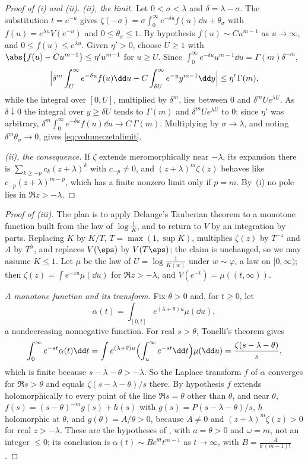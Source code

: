\begin{refsection}
\begin{proof}[Proof of (i) and (ii)]
\emph{(ii), the limit.} Let $0<\sigma<\lambda$ and $\delta=\lambda-\sigma$. The substitution $t=e^{-u}$ gives $\zeta(-\sigma)=\sigma\int_0^\infty e^{-\delta u}f(u)\dd u+\theta_\sigma$ with $f(u)=e^{\lambda u}V(e^{-u})$ and $0\le\theta_\sigma\le1$. By hypothesis $f(u)\sim Cu^{m-1}$ as $u\to\infty$, and $0\le f(u)\le e^{\lambda u}$. Given $\eta'>0$, choose $U\ge1$ with $\abs{f(u)-Cu^{m-1}}\le\eta'u^{m-1}$ for $u\ge U$. Since $\int_0^\infty e^{-\delta u}u^{m-1}\dd u=\Gamma(m)\delta^{-m}$,
\[
\Bigl\lvert\delta^m\int_U^\infty e^{-\delta u}f(u)\dd u-C\int_{\delta U}^\infty e^{-y}y^{m-1}\dd y\Bigr\rvert\le\eta'\,\Gamma(m),
\]
while the integral over $[0,U]$, multiplied by $\delta^m$, lies between $0$ and $\delta^mUe^{\lambda U}$. As $\delta\downarrow0$ the integral over $y\ge\delta U$ tends to $\Gamma(m)$ and $\delta^mUe^{\lambda U}$ to $0$; since $\eta'$ was arbitrary, $\delta^m\int_0^\infty e^{-\delta u}f(u)\dd u\to C\,\Gamma(m)$. Multiplying by $\sigma\to\lambda$, and noting $\delta^m\theta_\sigma\to0$, gives \eqref{eq:volume:zetalimit}.

\emph{(ii), the consequence.} If $\zeta$ extends meromorphically near $-\lambda$, its expansion there is $\sum_{k\ge-p}c_k(z+\lambda)^k$ with $c_{-p}\ne0$, and $(z+\lambda)^m\zeta(z)$ behaves like $c_{-p}(z+\lambda)^{m-p}$, which has a finite nonzero limit only if $p=m$. By~(i) no pole lies in $\Re z>-\lambda$.
\end{proof}

\begin{proof}[Proof of (iii)]
The plan is to apply Delange's Tauberian theorem to a monotone function built from the law of $\log\frac1K$, and to return to $V$ by an integration by parts. Replacing $K$ by $K/T$, $T=\max(1,\sup K)$, multiplies $\zeta(z)$ by $T^{-z}$ and $A$ by $T^\lambda$, and replaces $V(\eps)$ by $V(T\eps)$; the claim is unchanged, so we may assume $K\le1$. Let $\mu$ be the law of $U=\log\frac1{K(w)}$ under $w\sim\varphi$, a law on $[0,\infty)$; then $\zeta(z)=\int e^{-zu}\mu(\dd u)$ for $\Re z>-\lambda$, and $V(e^{-t})=\mu((t,\infty))$.

\emph{A monotone function and its transform.} Fix $\theta>0$ and, for $t\ge0$, let
\[
\alpha(t)=\int_{[0,t]}e^{(\lambda+\theta)u}\mu(\dd u),
\]
a nondecreasing nonnegative function. For real $s>\theta$, Tonelli's theorem gives
\[
\int_0^\infty e^{-st}\alpha(t)\dd t=\int e^{(\lambda+\theta)u}\Bigl(\int_u^\infty e^{-st}\dd t\Bigr)\mu(\dd u)=\frac{\zeta(s-\lambda-\theta)}s,
\]
which is finite because $s-\lambda-\theta>-\lambda$. So the Laplace transform $f$ of $\alpha$ converges for $\Re s>\theta$ and equals $\zeta(s-\lambda-\theta)/s$ there. By hypothesis $f$ extends holomorphically to every point of the line $\Re s=\theta$ other than $\theta$, and near $\theta$, $f(s)=(s-\theta)^{-m}g(s)+h(s)$ with $g(s)=P(s-\lambda-\theta)/s$, $h$ holomorphic at $\theta$, and $g(\theta)=A/\theta>0$, because $A\ne0$ and $(z+\lambda)^m\zeta(z)>0$ for real $z>-\lambda$. These are the hypotheses of \textcite[Th\'eor\`eme~III]{Delange1954}, with $a=\theta>0$ and $\omega=m$, not an integer $\le0$; its conclusion is $\alpha(t)\sim Be^{\theta t}t^{m-1}$ as $t\to\infty$, with $B=\frac{A}{\theta\,(m-1)!}$.


\end{proof}
\end{refsection}
